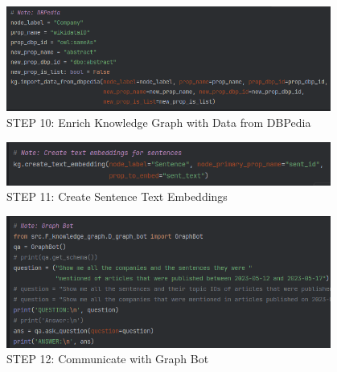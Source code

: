 \begin{figure}[H]   %
    \centering
    \includegraphics[width=0.95\textwidth]{Assets/main-10}
    \caption{STEP 10: Enrich Knowledge Graph with Data from DBPedia}
    \label{fig:main-10}
\end{figure}
\begin{figure}[H]   %
    \centering
    \includegraphics[width=0.95\textwidth]{Assets/main-11}
    \caption{STEP 11: Create Sentence Text Embeddings}
    \label{fig:main-11}
\end{figure}
\begin{figure}[H]   %
    \centering
    \includegraphics[width=0.95\textwidth]{Assets/main-12}
    \caption{STEP 12: Communicate with Graph Bot}
    \label{fig:main-12}
\end{figure}
